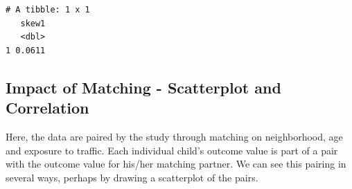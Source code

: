 \documentclass[
]{book}
\newenvironment{Shaded}{\begin{snugshade}}{\end{snugshade}}
\newcommand{\DataTypeTok}[1]{\textcolor[rgb]{0.13,0.29,0.53}{#1}}
\newcommand{\DecValTok}[1]{\textcolor[rgb]{0.00,0.00,0.81}{#1}}
\newcommand{\KeywordTok}[1]{\textcolor[rgb]{0.13,0.29,0.53}{\textbf{#1}}}
\newcommand{\NormalTok}[1]{#1}
\newcommand{\OperatorTok}[1]{\textcolor[rgb]{0.81,0.36,0.00}{\textbf{#1}}}
\newcommand{\OtherTok}[1]{\textcolor[rgb]{0.56,0.35,0.01}{#1}}
\newcommand{\StringTok}[1]{\textcolor[rgb]{0.31,0.60,0.02}{#1}}
\begin{document}
\begin{verbatim}
# A tibble: 1 x 1
   skew1
   <dbl>
1 0.0611
\end{verbatim}

\hypertarget{impact-of-matching---scatterplot-and-correlation}{%
\subsection{Impact of Matching - Scatterplot and Correlation}\label{impact-of-matching---scatterplot-and-correlation}}

Here, the data are paired by the study through matching on neighborhood, age and exposure to traffic. Each individual child's outcome value is part of a pair with the outcome value for his/her matching partner. We can see this pairing in several ways, perhaps by drawing a scatterplot of the pairs.

\begin{Shaded}
\end{Shaded}
\end{document}
